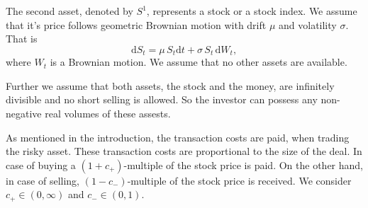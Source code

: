 The second asset, denoted by $S^1$, represents a stock or a stock index. We assume that it's price follows geometric Brownian motion with drift $\mu$ and volatility $\sigma$. That is
\begin{equation}
\mathrm{d}S_t=\mu\,S_t\mathrm{d}t+\sigma\,S_t\,\mathrm{d}W_t,
\end{equation}
where $W_t$ is a Brownian motion. 
We assume that no other assets are available.%

Further we assume that both assets, the stock and the money, are infinitely divisible and no short selling is allowed. So the investor can possess any non-negative real volumes of these assests.

As mentioned in the introduction, the transaction costs are paid, when trading the risky asset. These transaction costs are proportional to the size of the deal. In case of buying a $(1+c_{+})$-multiple of the stock price is paid. On the other hand, in case of selling, $(1-c_{-})$-multiple of the stock price is received. We consider $c_{+}\in(0,\infty)$ and $c_{-}\in(0,1)$.

